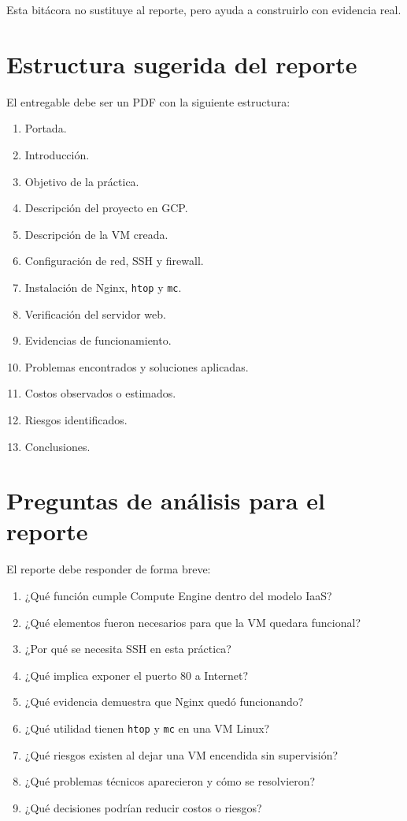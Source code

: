 \documentclass[
  coursetitle={Cómputo Nube y Tecnologías Emergentes},
  coursehours={96},
  coursedate={Verano 2026},
  doctype={Práctica},
  otherlangs={english,french},
  authorname={Lázaro},
  authorsurname={Bustio-Martínez},
  authortitle={PhD},
  role={Profesor Investigador},
  email={lbustio@inaoe.mx},
  phone={5559504000},
  ext={7459},
  institution={Instituto Nacional de Astrofísica, Óptica y Electrónica (INAOE)},
  department={Maestría en Ciencias en Tecnologías de Seguridad},
  address={Luis Enrique Erro 1, Sta. Ma. Tonantzintla, San Andrés Cholula, CP 72840, Puebla, México},
  margin={0.5in}
]{../../lbustio_lecture_notes}
\begin{document}
Esta bitácora no sustituye al reporte, pero ayuda a construirlo con evidencia real.

\section{Estructura sugerida del reporte}

El entregable debe ser un PDF con la siguiente estructura:

\begin{enumerate}
    \item Portada.
    \item Introducción.
    \item Objetivo de la práctica.
    \item Descripción del proyecto en GCP.
    \item Descripción de la VM creada.
    \item Configuración de red, SSH y firewall.
    \item Instalación de Nginx, \texttt{htop} y \texttt{mc}.
    \item Verificación del servidor web.
    \item Evidencias de funcionamiento.
    \item Problemas encontrados y soluciones aplicadas.
    \item Costos observados o estimados.
    \item Riesgos identificados.
    \item Conclusiones.
\end{enumerate}

\section{Preguntas de análisis para el reporte}

El reporte debe responder de forma breve:

\begin{enumerate}
    \item ¿Qué función cumple Compute Engine dentro del modelo IaaS?
    \item ¿Qué elementos fueron necesarios para que la VM quedara funcional?
    \item ¿Por qué se necesita SSH en esta práctica?
    \item ¿Qué implica exponer el puerto 80 a Internet?
    \item ¿Qué evidencia demuestra que Nginx quedó funcionando?
    \item ¿Qué utilidad tienen \texttt{htop} y \texttt{mc} en una VM Linux?
    \item ¿Qué riesgos existen al dejar una VM encendida sin supervisión?
    \item ¿Qué problemas técnicos aparecieron y cómo se resolvieron?
    \item ¿Qué decisiones podrían reducir costos o riesgos?
\end{enumerate}
\end{document}
